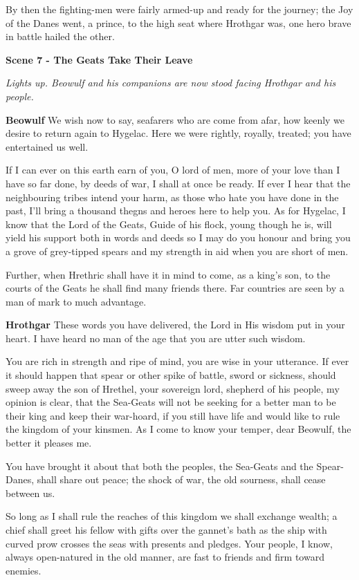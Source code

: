\documentclass[a4paper]{article}
\begin{document}
{By then the fighting-men were fairly armed-up
and ready for the journey; the Joy of the Danes went,
a prince, to the high seat where Hrothgar was,
one hero brave in battle hailed the other.

\centerline{\textbf{Scene 7 - The Geats Take Their Leave}}
\centerline{\textit{Lights up. Beowulf and his companions are now stood facing Hrothgar and his people.}}

\textbf{Beowulf} We wish now to say, seafarers who
are come from afar, how keenly we desire
to return again to Hygelac. Here we were rightly,
royally, treated; you have entertained us well.

If I can ever on this earth earn of you,
O lord of men, more of your love
than I have so far done, by deeds of war,
I shall at once be ready. If ever I hear
that the neighbouring tribes intend your harm,
as those who hate you have done in the past,
I’ll bring a thousand thegns and heroes
here to help you. As for Hygelac, I know
that the Lord of the Geats, Guide of his flock,
young though he is, will yield his support
both in words and deeds so I may do you honour
and bring you a grove of grey-tipped spears
and my strength in aid when you are short of men.

Further, when Hrethric shall have it in mind
to come, as a king’s son, to the courts of the Geats
he shall find many friends there. Far countries are seen
by a man of mark to much advantage.

\textbf{Hrothgar} These words you have delivered, the Lord in His wisdom
put in your heart. I have heard no man
of the age that you are utter such wisdom.

You are rich in strength and ripe of mind,
you are wise in your utterance. If ever it should happen
that spear or other spike of battle,
sword or sickness, should sweep away
the son of Hrethel, your sovereign lord,
shepherd of his people, my opinion is clear,
that the Sea-Geats will not be seeking for a better
man to be their king and keep their war-hoard,
if you still have life and would like to rule
the kingdom of your kinsmen. As I come to know
your temper, dear Beowulf, the better it pleases me.

You have brought it about that both the peoples,
the Sea-Geats and the Spear-Danes,
shall share out peace; the shock of war,
the old sourness, shall cease between us.

So long as I shall rule the reaches of this kingdom
we shall exchange wealth; a chief shall greet
his fellow with gifts over the gannet’s bath
as the ship with curved prow crosses the seas
with presents and pledges. Your people, I know,
always open-natured in the old manner,
are fast to friends and firm toward enemies.

}
\end{document}
